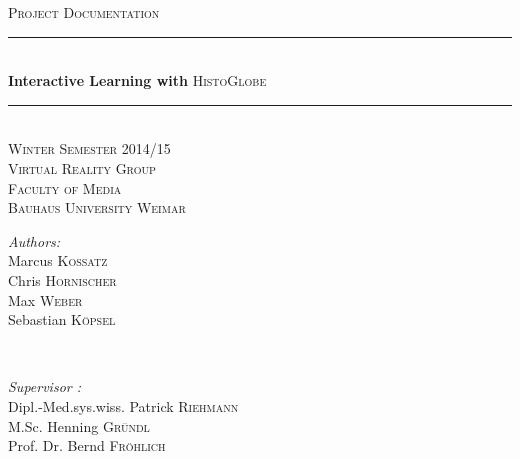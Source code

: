 \begin{titlepage}

\newcommand{\HRule}{\rule{\linewidth}{0.5mm}}

\center %

\textsc{\Large Project Documentation}\\[1.5cm] %

\HRule \\[0.7cm]
{ \huge \textbf{Interactive Learning with} \textsc{HistoGlobe}}\\[0.4cm] %
\HRule \\[3cm]

\textsc{\large Winter Semester 2014/15 } \\ [0.5cm]
\textsc{\large Virtual Reality Group } \\ [0.25cm]
\textsc{\large Faculty of Media } \\ [0.25cm]
\textsc{\large Bauhaus University Weimar}\\[3cm]


\begin{minipage}{0.4\textwidth}
\begin{flushleft} \large
\emph{Authors:}
\\Marcus \textsc{Kossatz}
\\Chris \textsc{Hornischer}
\\Max \textsc{Weber}
\\Sebastian \textsc{Köpsel}
\end{flushleft}
\end{minipage}
~
\begin{minipage}{0.5\textwidth}
\begin{flushright} \large
\emph{Supervisor :}
\\Dipl.-Med.sys.wiss. Patrick \textsc{Riehmann}
\\M.Sc. Henning \textsc{Gründl}
\\Prof. Dr. Bernd \textsc{Fröhlich}
\end{flushright}
\end{minipage}\\[2cm]
~


\end{titlepage}
